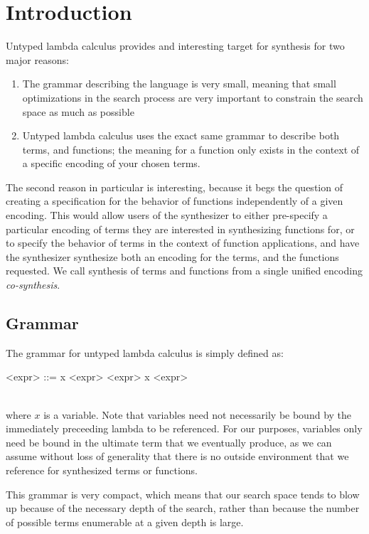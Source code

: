 \section{Introduction}

Untyped lambda calculus provides and interesting target for synthesis for
  two major reasons:
  \begin{enumerate}
    \item The grammar describing the language is very small, meaning that
      small optimizations in the search process are very important to
      constrain the search space as much as possible
    \item Untyped lambda calculus uses the exact same grammar to describe
      both terms, and functions; the meaning for a function only exists
      in the context of a specific encoding of your chosen terms.
  \end {enumerate}
The second reason in particular is interesting, because it begs the
  question of creating a specification for the behavior of functions
  independently of a given encoding.
This would allow users of the synthesizer to either pre-specify a
  particular encoding of terms they are interested in synthesizing
  functions for, or to specify the behavior of terms in the context of
  function applications, and have the synthesizer synthesize both
  an encoding for the terms, and the functions requested.
We call synthesis of terms and functions from a single unified encoding
  \emph{co-synthesis}.

\subsection{Grammar}

The grammar for untyped lambda calculus is simply defined as:
  \begin{grammar}
    <expr> ::= x
      \alt <expr> <expr>
      \alt \lambda x <expr>
  \end{grammar} \\
  where $x$ is a variable.
Note that variables need not necessarily be bound by the immediately
  preceeding lambda to be referenced.
For our purposes, variables only need be bound in the ultimate term
  that we eventually produce, as we can assume without loss of
  generality that there is no outside environment that we reference
  for synthesized terms or functions.

This grammar is very compact, which means that our search space tends to
  blow up because of the necessary depth of the search, rather than
  because the number of possible terms enumerable at a given depth
  is large.

